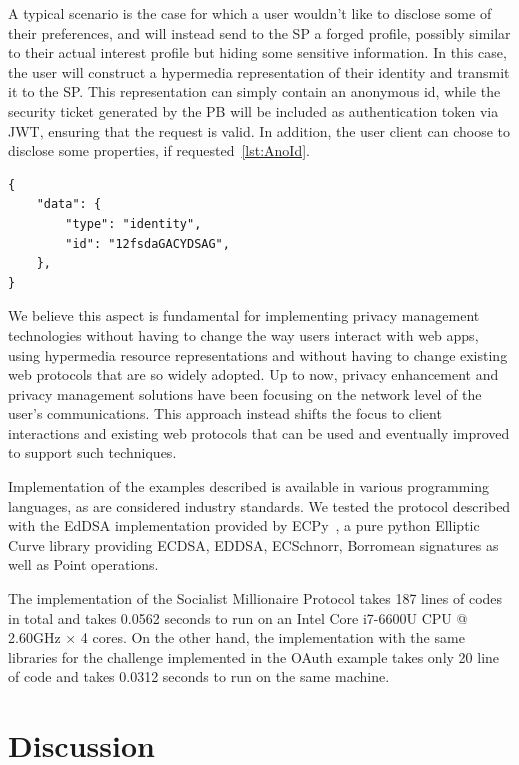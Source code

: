 A typical scenario is the case for which a user wouldn't like to disclose some of their preferences, and will instead send to the SP a forged profile, possibly similar to their actual interest profile but hiding some sensitive information. In this case, the user will construct a hypermedia representation of their identity and transmit it to the SP. This representation can simply contain an anonymous id, while the security ticket generated by the PB will be included as authentication token via JWT, ensuring that the request is valid. In addition, the user client can choose to disclose some properties, if requested~\ref{lst:AnoId}.

\begin{lstlisting}
{
    "data": {
        "type": "identity",
        "id": "12fsdaGACYDSAG",
    },
}
\end{lstlisting}

We believe this aspect is fundamental for implementing privacy management technologies without having to change the way users interact with web apps, using hypermedia resource representations and without having to change existing web protocols that are so widely adopted. Up to now, privacy enhancement and privacy management solutions have been focusing on the network level of the user's communications. This approach instead shifts the focus to client interactions and existing web protocols that can be used and eventually improved to support such techniques.

Implementation of the examples described is available in various programming languages, as are considered industry standards. We tested the protocol described with the EdDSA implementation provided by ECPy~\cite{ecpy}, a pure python Elliptic Curve library providing ECDSA, EDDSA, ECSchnorr, Borromean signatures as well as Point operations.

The implementation of the Socialist Millionaire Protocol takes 187 lines of codes in total and takes 0.0562 seconds to run on an Intel Core i7-6600U CPU @ 2.60GHz × 4 cores. On the other hand, the implementation with the same libraries for the challenge implemented in the OAuth example takes only 20 line of code and takes 0.0312 seconds to run on the same machine.

\section{Discussion}

